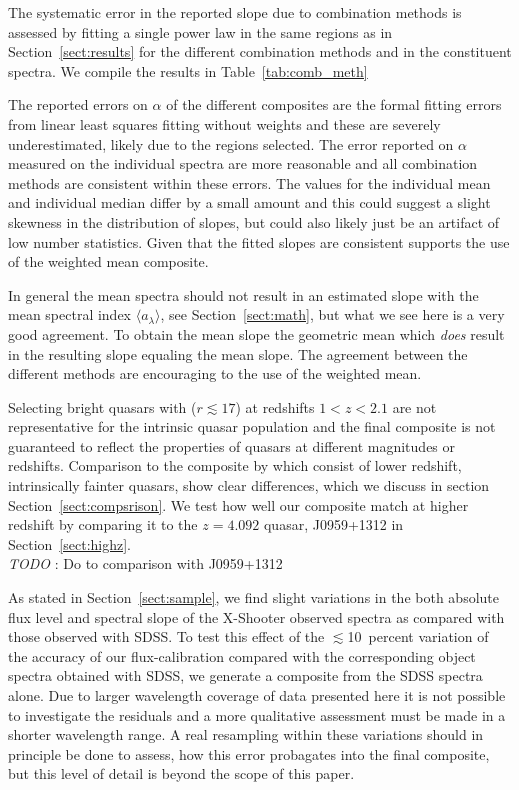 \documentclass{aa}    %
\newcommand{\Tab}[1]{Table~\ref{tab:#1}}
\newcommand{\tab}[1]{\Tab{#1}}
\newcommand{\tablabel}[1]{\label{tab:#1}}
\newcommand{\sectionname}{Section}
\newcommand{\Sect}[1]{\sectionname~\ref{sect:#1}}
\newcommand{\sect}[1]{\Sect{#1}}
\newcommand{\todo}[3]{{\color{#2}\emph{#1}: #3}}
\newcommand{\jstodo}[1]{\todo{ \\TODO }{green}{#1}}
\begin{document}
The systematic error in the reported slope due to combination methods is assessed by fitting a single power law in the same regions as in \sect{results} for the different combination methods and in the constituent spectra. We compile the results in \tab{comb_meth}

 \tablabel{comb_meth} 

The reported errors on $\alpha$ of the different composites are the formal fitting errors from linear least squares fitting without weights and these are severely underestimated, likely due to the regions selected. The error reported on $\alpha$ measured on the individual spectra are more reasonable and all combination methods are consistent within these errors. The values for the individual mean and individual median differ by a small amount and this could suggest a slight skewness in the distribution of slopes, but could also likely just be an artifact of low number statistics. Given that the fitted slopes are consistent supports the use of the weighted mean composite.

In general the mean spectra should not result in an estimated slope with the mean spectral index $\langle a_\lambda\rangle$, see \sect{math}, but what we see here is a very good agreement. To obtain the mean slope the geometric mean which \textit{does} result in the resulting slope equaling the mean slope. The agreement between the different methods are encouraging to the use of the weighted mean.





Selecting bright quasars with ($r \lesssim 17$) at redshifts $1 < z < 2.1$ are not representative for the intrinsic quasar population \citep{Paris2014} and the final composite is not guaranteed to reflect the properties of quasars at different magnitudes or redshifts. Comparison to the composite by \citep{VandenBerk2001} which consist of lower redshift, intrinsically fainter quasars, show clear differences, which we discuss in section \sect{compsrison}. We test how well our composite match at higher redshift by comparing it to the $z=4.092$ quasar, J0959+1312 in \sect{highz}.
\jstodo{Do to comparison with J0959+1312}





As stated in \sect{sample}, we find slight variations in the both absolute flux level and spectral slope of the X-Shooter observed spectra as compared with those observed with SDSS. To test this effect of the $\lesssim$10~percent variation of the accuracy of our flux-calibration compared with the corresponding object spectra obtained with SDSS, we generate a composite from the SDSS spectra alone. Due to larger wavelength coverage of data presented here it is not possible to investigate the residuals and a more qualitative assessment must be made in a shorter wavelength range.
A real resampling within these variations should in principle be done to assess, how this error probagates into the final composite, but this level of detail is beyond the scope of this paper. 
\end{document}
